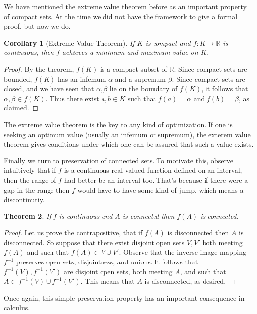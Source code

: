 \documentclass[11pt,oneside]{amsbook}
\newcommand{\R}{\mathbb R}
\theoremstyle{definition}
\theoremstyle{plain}
\newtheorem{theorem}{Theorem}[section]
\newtheorem{corollary}[theorem]{Corollary}
\theoremstyle{definition}
\theoremstyle{remark}
\numberwithin{equation}{section}
\numberwithin{figure}{section}
\begin{document}
We have mentioned the extreme value theorem before as an important property of compact sets. At the time we did not have the framework to give a formal proof, but now we do.

\begin{corollary}[Extreme Value Theorem]
  \label{cor:evt}
  If $K$ is compact and $f\colon K\to\R$ is continuous, then $f$ achieves a minimum and maximum value on $K$.
\end{corollary}

\begin{proof}
  By the theorem, $f(K)$ is a compact subset of $\R$. Since compact sets are bounded, $f(K)$ has an infemum $\alpha$ and a supremum $\beta$. Since compact sets are closed, and we have seen that $\alpha,\beta$ lie on the boundary of $f(K)$, it follows that $\alpha,\beta\in f(K)$. Thus there exist $a,b\in K$ such that $f(a)=\alpha$ and $f(b)=\beta$, as claimed.
\end{proof}

The extreme value theorem is the key to any kind of optimization. If one is seeking an optimum value (usually an infemum or supremum), the exterem value theorem gives conditions under which one can be assured that such a value exists.

Finally we turn to preservation of connected sets. To motivate this, observe intuitively that if $f$ is a continuous real-valued function defined on an interval, then the range of $f$ had better be an interval too. That's because if there were a gap in the range then $f$ would have to have some kind of jump, which means a discontinutiy. 

\begin{theorem}
  If $f$ is continuous and $A$ is connected then $f(A)$ is connected.
\end{theorem}

\begin{proof}
  Let us prove the contrapositive, that if $f(A)$ is disconnected then $A$ is disconnected. So suppose that there exist disjoint open sets $V,V'$ both meeting $f(A)$ and such that $f(A)\subset V\cup V'$. Observe that the inverse image mapping $f^{-1}$ preserves open sets, disjointness, and unions. It follows that $f^{-1}(V),f^{-1}(V')$ are disjoint open sets, both meeting $A$, and such that $A\subset f^{-1}(V)\cup f^{-1}(V')$. This means that $A$ is disconnected, as desired.
\end{proof}

Once again, this simple preservation property has an important consequence in calculus.
\end{document}

